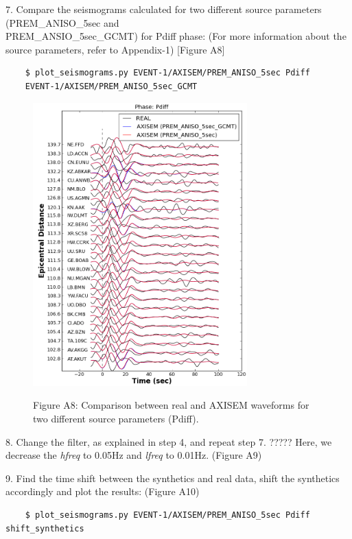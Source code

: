 \documentclass{article}
\begin{document}
7. Compare the seismograms calculated for two different source parameters (PREM\_ANISO\_5sec and \\
PREM\_ANSIO\_5sec\_GCMT) for Pdiff phase: (For more information about the source 
parameters, refer to Appendix-1) [Figure A8]

\begin{verbatim}
    $ plot_seismograms.py EVENT-1/AXISEM/PREM_ANISO_5sec Pdiff 
    EVENT-1/AXISEM/PREM_ANISO_5sec_GCMT
\end{verbatim}

\begin{figure}
\centering
\includegraphics[width=234pt, height=310pt, keepaspectratio=true]{AXISEMTutorial-fig014.png}
\begin{center}
{\small{}Figure A8: Comparison between real and AXISEM waveforms for two different 
source parameters (Pdiff).}
\end{center}
\end{figure}

8. Change the filter, as explained in step 4, and repeat step 7. ????? Here, we decrease 
the \textit{hfreq} to 0.05Hz and \textit{lfreq} to 0.01Hz. (Figure A9)

9. Find the time shift between the synthetics and real data, shift the synthetics 
accordingly and plot the results: (Figure A10)

\begin{verbatim}
    $ plot_seismograms.py EVENT-1/AXISEM/PREM_ANISO_5sec Pdiff shift_synthetics
\end{verbatim}
\end{document}
